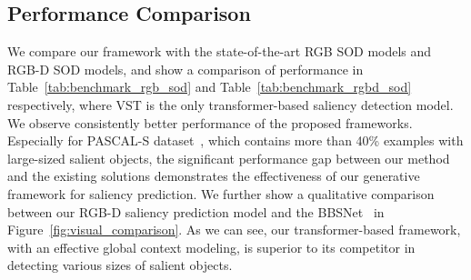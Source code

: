 \documentclass{article}
\begin{document}
\subsection{Performance Comparison}


We compare our framework with the state-of-the-art RGB SOD models and RGB-D SOD models, and show a comparison of performance in Table~\ref{tab:benchmark_rgb_sod} and Table~\ref{tab:benchmark_rgbd_sod} respectively, where VST \cite{Liu_2021_ICCV_VST} is the only transformer-based saliency detection model.
We observe consistently better performance of the proposed frameworks. Especially for PASCAL-S dataset~\cite{pascal_s_dataset}, which contains more than 40\% examples with large-sized salient objects, the significant performance gap between our method and the existing solutions demonstrates the effectiveness of our generative framework for saliency prediction.
We further show a qualitative comparison between our RGB-D saliency prediction model and the BBSNet~\cite{fan2020bbs} in Figure~\ref{fig:visual_comparison}. As we can see, our transformer-based framework, with an effective global context modeling, is superior to its competitor in detecting various sizes of salient objects. 
\end{document}
